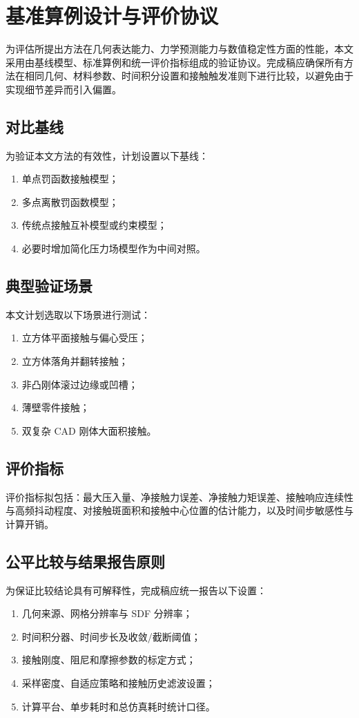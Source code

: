 \section{基准算例设计与评价协议}
为评估所提出方法在几何表达能力、力学预测能力与数值稳定性方面的性能，本文采用由基线模型、标准算例和统一评价指标组成的验证协议。完成稿应确保所有方法在相同几何、材料参数、时间积分设置和接触触发准则下进行比较，以避免由于实现细节差异而引入偏置。

\subsection{对比基线}
为验证本文方法的有效性，计划设置以下基线：
\begin{enumerate}[label=(\arabic*)]
    \item 单点罚函数接触模型；
    \item 多点离散罚函数模型；
    \item 传统点接触互补模型或约束模型；
    \item 必要时增加简化压力场模型作为中间对照。
\end{enumerate}

\subsection{典型验证场景}
本文计划选取以下场景进行测试：
\begin{enumerate}[label=(\arabic*)]
    \item 立方体平面接触与偏心受压；
    \item 立方体落角并翻转接触；
    \item 非凸刚体滚过边缘或凹槽；
    \item 薄壁零件接触；
    \item 双复杂 CAD 刚体大面积接触。
\end{enumerate}

\subsection{评价指标}
评价指标拟包括：最大压入量、净接触力误差、净接触力矩误差、接触响应连续性与高频抖动程度、对接触斑面积和接触中心位置的估计能力，以及时间步敏感性与计算开销。

\subsection{公平比较与结果报告原则}
为保证比较结论具有可解释性，完成稿应统一报告以下设置：
\begin{enumerate}[label=(\arabic*)]
    \item 几何来源、网格分辨率与 SDF 分辨率；
    \item 时间积分器、时间步长及收敛/截断阈值；
    \item 接触刚度、阻尼和摩擦参数的标定方式；
    \item 采样密度、自适应策略和接触历史滤波设置；
    \item 计算平台、单步耗时和总仿真耗时统计口径。
\end{enumerate}
